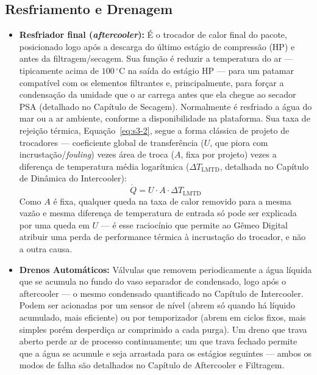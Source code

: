 \documentclass[12pt,a4paper]{article}
\numberwithin{equation}{section}
\numberwithin{table}{section}
\numberwithin{figure}{section}
\begin{document}
	\subsection{\textbf{Resfriamento e Drenagem}}
	\begin{itemize}
		\item \textbf{Resfriador final (\textit{aftercooler}):} É o trocador de calor final do pacote, posicionado logo após a descarga do último estágio de compressão (HP) e antes da filtragem/secagem. Sua função é reduzir a temperatura do ar — tipicamente acima de $100\,^{\circ}\text{C}$ na saída do estágio HP — para um patamar compatível com os elementos filtrantes e, principalmente, para forçar a condensação da umidade que o ar carrega antes que ela chegue ao secador PSA (detalhado no Capítulo de Secagem). Normalmente é resfriado a água do mar ou a ar ambiente, conforme a disponibilidade na plataforma. Sua taxa de rejeição térmica, Equação~\eqref{eq:s3-2}, segue a forma clássica de projeto de trocadores — coeficiente global de transferência ($U$, que piora com incrustação/\textit{fouling}) vezes área de troca ($A$, fixa por projeto) vezes a diferença de temperatura média logarítmica ($\Delta T_{\text{LMTD}}$, detalhada no Capítulo de Dinâmica do Intercooler):
		\begin{equation}\label{eq:s3-2}
 \dot{Q} = U \cdot A \cdot \Delta T_{\text{LMTD}}
\end{equation}
		Como $A$ é fixa, qualquer queda na taxa de calor removido para a mesma vazão e mesma diferença de temperatura de entrada só pode ser explicada por uma queda em $U$ — é esse raciocínio que permite ao Gêmeo Digital atribuir uma perda de performance térmica à incrustação do trocador, e não a outra causa.
		\item \textbf{Drenos Automáticos:} Válvulas que removem periodicamente a água líquida que se acumula no fundo do vaso separador de condensado, logo após o aftercooler — o mesmo condensado quantificado no Capítulo de Intercooler. Podem ser acionadas por um sensor de nível (abrem só quando há líquido acumulado, mais eficiente) ou por temporizador (abrem em ciclos fixos, mais simples porém desperdiça ar comprimido a cada purga). Um dreno que trava aberto perde ar de processo continuamente; um que trava fechado permite que a água se acumule e seja arrastada para os estágios seguintes — ambos os modos de falha são detalhados no Capítulo de Aftercooler e Filtragem.
	\end{itemize}
	
\end{document}
